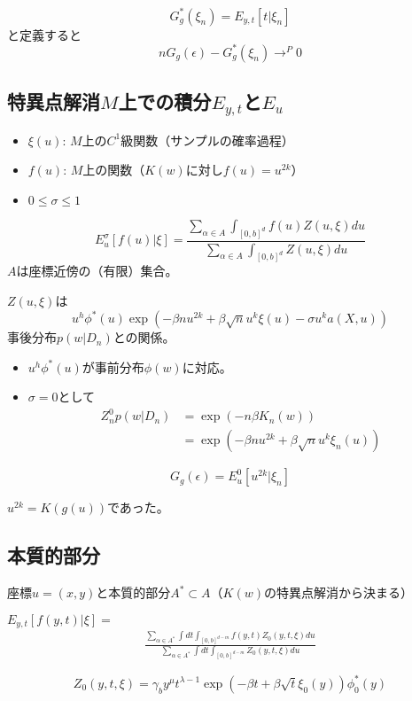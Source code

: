 \documentclass[uplatex, slide, papersize]{jsarticle}
\begin{document}
\begin{lem}[6.51]
\[
G_g^*(\xi_n)=E_{y,t}[t\vert\xi_n]
\]
と定義すると
\[
nG_g(\epsilon)-G_g^*(\xi_n)\to^P0
\]
\end{lem}
\newpage
\subsection*{特異点解消$M$上での積分$E_{y,t}$と$E_u$}
\begin{itemize}
\item $\xi(u)$: $M$上の$C^1$級関数（サンプルの確率過程）
\item$f(u)$: $M$上の関数（$K(w)$に対し$f(u)= u^{2k}$）
\item $0\leq\sigma\leq1$
\end{itemize}
\[
E^\sigma_u[f(u)\vert\xi]=\frac{\displaystyle\sum_{\alpha\in A}\int_{[0,b]^d}f(u)Z(u,\xi)du}{\displaystyle\sum_{\alpha\in A}\int_{[0,b]^d}Z(u,\xi)du}
\]
$A$は座標近傍の（有限）集合。

$Z(u,\xi)$は
\[
u^h\phi^*(u)\exp(-\beta nu^{2k}+\beta\sqrt{n}u^k\xi(u)-\sigma u^ka(X,u))
\]
事後分布$p(w\vert D_n)$との関係。
\begin{itemize}
\item $u^h\phi^*(u)$が事前分布$\phi(w)$に対応。
\item $\sigma=0$として
\begin{align*}
Z_n^0p(w\vert D_n)&=\exp(-n\beta K_n(w))\\
&=\exp(-\beta nu^{2k}+\beta\sqrt{n}u^k\xi_n(u))
\end{align*} 
\end{itemize}
\begin{lem}[6.41]
\[
G_g(\epsilon)=E^0_u[u^{2k}\vert\xi_n]
\]
\end{lem}

$u^{2k}=K(g(u))$であった。
\newpage
\subsection*{本質的部分}
座標$u=(x,y)$と本質的部分$A^*\subset A$（$K(w)$の特異点解消から決まる）

$E_{y,t}[f(y,t)\vert\xi]= $
\begin{align*}
\frac{\displaystyle\sum_{\alpha\in A^*}\int dt\int_{[0,b]^{d-m}}f(y, t)Z_0(y, t,\xi)du}{\displaystyle\sum_{\alpha\in A^*}\int dt\int_{[0,b]^{d-m}}Z_0(y, t,\xi)du}
\end{align*}

\[
Z_0(y,t,\xi)=\gamma_by^\mu t^{\lambda-1}\exp(-\beta t+\beta\sqrt{t}\xi_0(y))\phi^*_0(y)
\]
\end{document}
